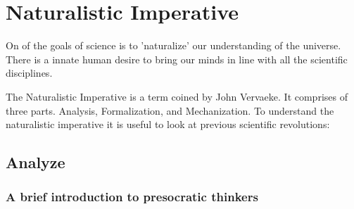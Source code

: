 \documentclass[twoside]{article}
\begin{document}
%
%
\section{Naturalistic Imperative}
On of the goals of science is to 'naturalize' our understanding of the universe.
There is a innate human desire to bring our minds in line with all the scientific
disciplines.

The Naturalistic Imperative is a term coined by John Vervaeke. It comprises
of three parts. Analysis, Formalization, and Mechanization. To understand
the naturalistic imperative it is useful to look at previous scientific revolutions:




\subsection{Analyze}
\subsubsection{A brief introduction to presocratic thinkers}
\end{document}
